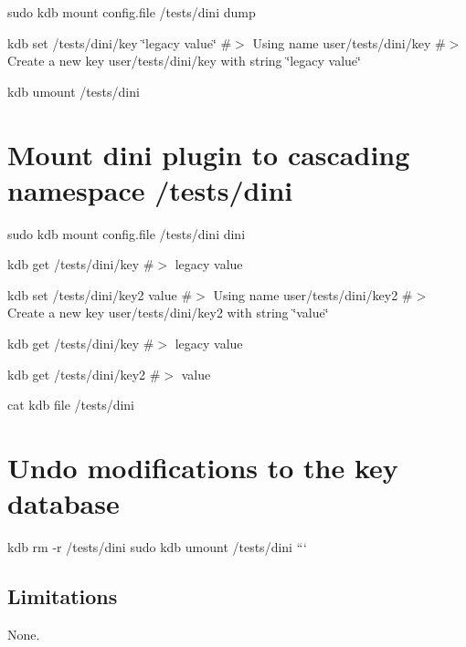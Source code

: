 sudo kdb mount config.\+file /tests/dini dump

kdb set /tests/dini/key \char`\"{}legacy value\char`\"{} \#$>$ Using name user/tests/dini/key \#$>$ Create a new key user/tests/dini/key with string \char`\"{}legacy value\char`\"{}

kdb umount /tests/dini

\section*{Mount dini plugin to cascading namespace {\ttfamily /tests/dini}}

sudo kdb mount config.\+file /tests/dini dini

kdb get /tests/dini/key \#$>$ legacy value

kdb set /tests/dini/key2 value \#$>$ Using name user/tests/dini/key2 \#$>$ Create a new key user/tests/dini/key2 with string \char`\"{}value\char`\"{}

kdb get /tests/dini/key \#$>$ legacy value

kdb get /tests/dini/key2 \#$>$ value

cat {\ttfamily kdb file /tests/dini}

\section*{Undo modifications to the key database}

kdb rm -\/r /tests/dini sudo kdb umount /tests/dini ```

\subsection*{Limitations}

None. 
